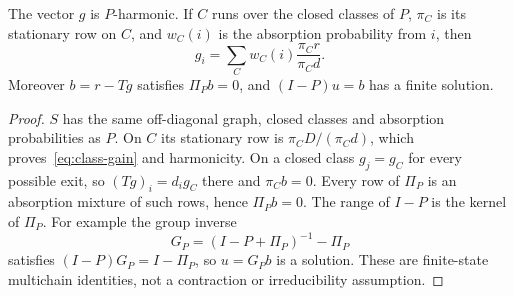 \begin{lemma}\label{lem:marked}
The vector $g$ is $P$-harmonic. If $C$ runs over the closed classes of $P$, $\pi_C$ is its stationary row on $C$, and $w_C(i)$ is the absorption probability from $i$, then
\begin{equation}\label{eq:class-gain}
 g_i=\sum_C w_C(i)\frac{\pi_Cr}{\pi_Cd}.
\end{equation}
Moreover $b=r-Tg$ satisfies $\Pi_Pb=0$, and $(I-P)u=b$ has a finite solution.
\end{lemma}
\begin{proof}
$S$ has the same off-diagonal graph, closed classes and absorption probabilities as $P$. On $C$ its stationary row is $\pi_C D/(\pi_Cd)$, which proves~\eqref{eq:class-gain} and harmonicity. On a closed class $g_j=g_C$ for every possible exit, so $(Tg)_i=d_i g_C$ there and $\pi_Cb=0$. Every row of $\Pi_P$ is an absorption mixture of such rows, hence $\Pi_Pb=0$. The range of $I-P$ is the kernel of $\Pi_P$. For example the group inverse
\[
 G_P=(I-P+\Pi_P)^{-1}-\Pi_P
\]
satisfies $(I-P)G_P=I-\Pi_P$, so $u=G_Pb$ is a solution. These are finite-state multichain identities, not a contraction or irreducibility assumption.
\end{proof}

